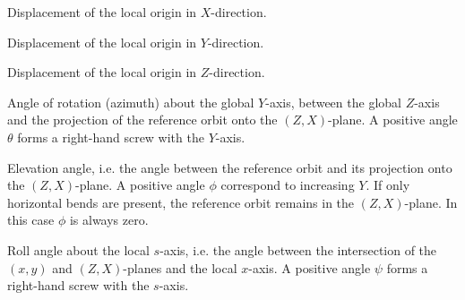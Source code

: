 \begin{mylist}
Displacement of the local origin in \(X\)-direction.

Displacement of the local origin in \(Y\)-direction.

Displacement of the local origin in \(Z\)-direction.

\ttitem[THETA]
Angle of rotation (azimuth) about the global \(Y\)-axis,
between the global \(Z\)-axis and the projection
of the reference orbit onto the \((Z, X)\)-plane.
A positive angle \(\theta\) forms a right-hand screw with the
\(Y\)-axis.

\ttitem[PHI]
Elevation angle,
i.e. the angle between the reference orbit and its projection
onto the \((Z, X)\)-plane.
A positive angle \(\phi\) correspond to increasing \(Y\).
If only horizontal bends are present,
the reference orbit remains in the \((Z, X)\)-plane.
In this case \(\phi\) is always zero.

\ttitem[PSI]
Roll angle about the local \(s\)-axis,
i.e. the angle between the intersection
of the \((x, y)\) and \((Z, X)\)-planes and the local \(x\)-axis.
A positive angle \(\psi\) forms a right-hand screw with the \(s\)-axis.
\end{mylist}

